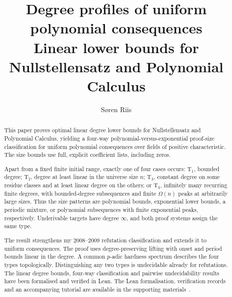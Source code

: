 \documentclass[11pt,a4paper]{article}
\title{Degree profiles of uniform polynomial consequences\\[3pt]
\large Linear lower bounds for Nullstellensatz and Polynomial Calculus}
\author{S\o ren Riis}
\date{}
\theoremstyle{definition}\newtheorem{definition}[theorem]{Definition}
\theoremstyle{remark}\newtheorem{remark}[theorem]{Remark}
\begin{document}
\maketitle
\begin{abstract}
This paper proves optimal linear degree lower bounds for Nullstellensatz
and Polynomial Calculus, yielding a four-way polynomial-versus-exponential
proof-size classification for uniform polynomial consequences over fields
of positive characteristic. The size bounds use full, explicit
coefficient lists, including zeros.

Apart from a fixed finite initial range, exactly one of four cases
occurs: $\mathrm T_1$, bounded degree; $\mathrm T_2$, degree at least
linear in the universe size $n$; $\mathrm T_3$, constant degree on some
residue classes and at least linear degree on the others; or
$\mathrm T_4$, infinitely many recurring finite degrees, with
bounded-degree subsequences and finite $\Omega(n)$ peaks at arbitrarily
large sizes. Thus the size patterns are polynomial bounds, exponential
lower bounds, a periodic mixture, or polynomial subsequences with finite
exponential peaks, respectively. Underivable targets have degree
$\infty$, and both proof systems assign the same type.

The result strengthens my 2008--2009 refutation classification and extends
it to uniform consequences. The proof uses degree-preserving lifting
with onset and period bounds linear in the degree. A common $p$-adic
hardness spectrum describes the four types topologically. Distinguishing
any two types is undecidable already for refutations. The linear degree bounds, four-way classification and pairwise
undecidability results have been formalised and verified in Lean. The Lean
formalisation, verification records and an accompanying tutorial are
available in the supporting materials~\cite{RiisSupporting}.
\end{abstract}
\medskip
\end{document}
